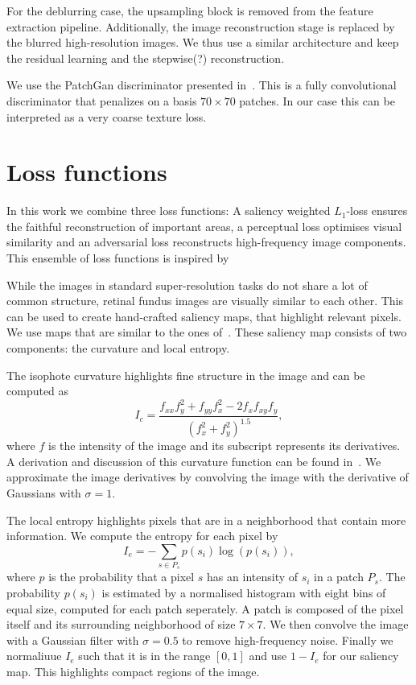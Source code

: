 \documentclass{scrartcl}
\newcommand{\img}{f} %
\begin{document}
For the deblurring case, the upsampling block is removed from the feature extraction pipeline.
Additionally, the image reconstruction stage is replaced by the blurred high-resolution images.
We thus use a similar architecture and keep the residual learning and the stepwise(?) reconstruction.

We use the PatchGan discriminator presented in~\cite{PatchGAN}.
This is a fully convolutional discriminator that penalizes on a basis $70\times70$ patches.
In our case this can be interpreted as a very coarse texture loss.


\section{Loss functions}
In this work we combine three loss functions:
A saliency weighted $L_1$-loss ensures the faithful reconstruction of important areas, a perceptual loss optimises visual similarity and an adversarial loss reconstructs high-frequency image components.
This ensemble of loss functions is inspired by~\cite{SaliencyGAN}

While the images in standard super-resolution tasks do not share a lot of common structure, retinal fundus images are visually similar to each other.
This can be used to create hand-crafted saliency maps, that highlight relevant pixels.
We use maps that are similar to the ones of~\cite{SaliencyGAN}.
These saliency map consists of two components: the curvature and local entropy.

The isophote curvature highlights fine structure in the image and can be computed as
\begin{equation}
 I_c = \frac{\img_{xx} \img_y^2 + f_{yy} \img_x^2 - 2 \img_{x} \img_{xy} \img_{y} }{(\img_x^2 + \img_y^2)^{1.5}},
\end{equation}
where \(\img\) is the intensity of the image and its subscript represents its derivatives.
A derivation and discussion of this curvature function can be found in~\cite{Curvature}.
We approximate the image derivatives by convolving the image with the derivative of Gaussians with \(\sigma = 1\).

The local entropy highlights pixels that are in a neighborhood that contain more information.
We compute the entropy for each pixel by
\begin{equation}
  \label{eq:entr}
  I_e = - \sum_{s \in P_s} p(s_i) \log(p(s_i)),
\end{equation}
where \(p\) is the probability that a pixel \(s\) has an intensity of \(s_i\) in a patch \(P_s\).
The probability $p(s_i)$ is estimated by a normalised histogram with eight bins of equal size, computed for each patch seperately.
A patch is composed of the pixel itself and its surrounding neighborhood of size \(7 \times 7\).
We then convolve the image with a Gaussian filter with \(\sigma = 0.5\) to remove high-frequency noise.
Finally we normaliuue $I_e$ such that it is in the range \([0, 1]\) and use $1 - I_e$ for our saliency map.
This highlights compact regions of the image.
\end{document}
